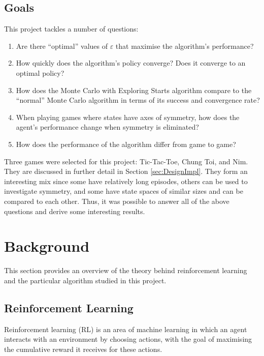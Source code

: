 \documentclass[11pt,a4paper]{report}
\begin{document}
\section{Goals}
\label{sec:goals}

This project tackles a number of questions:

\begin{enumerate}
	\item Are there ``optimal'' values of $\varepsilon$ that maximise the algorithm's performance?
	\item How quickly does the algorithm's policy converge? Does it converge to an optimal policy?
    \item How does the Monte Carlo with Exploring Starts algorithm \cite{rl-book} compare to the ``normal'' Monte Carlo algorithm in terms of its success and convergence rate?
	\item When playing games where states have axes of symmetry, how does the agent's performance change when symmetry is eliminated?
	\item How does the performance of the algorithm differ from game to game?
\end{enumerate}

Three games were selected for this project: Tic-Tac-Toe, Chung Toi, and Nim. They are discussed in further detail in Section \ref{sec:DesignImpl}. They form an interesting mix since some have relatively long episodes, others can be used to investigate symmetry, and some have state spaces of similar sizes and can be compared to each other. Thus, it was possible to answer all of the above questions and derive some interesting results.



\chapter{Background}

This section provides an overview of the theory behind reinforcement learning and the particular algorithm studied in this project.

\section{Reinforcement Learning}
\label{sec:RL}

Reinforcement learning (RL) is an area of machine learning in which an agent interacts with an environment by choosing actions, with the goal of maximising the cumulative reward it receives for these actions.
\end{document}
